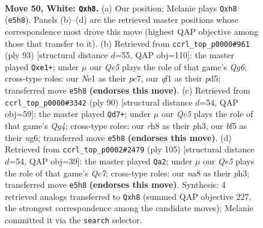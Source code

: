 \documentclass[11pt]{article}
\begin{document}
\clearpage

\begin{figure}[p]\centering
\begin{subfigure}{0.46\textwidth}\centering
\resizebox{\linewidth}{!}{%
\newchessgame
\chessboard[
  setfen={n6r/8/8/1p2Qbk1/7p/P2P4/7K/4Nq2 w - - 14 50},
  showmover=false,
  pgfstyle=straightmove, color=movearrow, markmove={e5-h8}
]}
\caption{}
\end{subfigure}\hfill
\begin{subfigure}{0.46\textwidth}\centering
\resizebox{\linewidth}{!}{%
\newchessgame
\chessboard[
  setfen={7k/2P5/7b/3Pp2Q/1P5p/6q1/6B1/4R1K1 b - - 4 47},
  showmover=false,
  pgfstyle=straightmove, color=movearrow, markmove={g3-e1}
]}
\caption{}
\end{subfigure}
\\[4pt]
\begin{subfigure}{0.46\textwidth}\centering
\resizebox{\linewidth}{!}{%
\newchessgame
\chessboard[
  setfen={8/6k1/3P2n1/p7/6Q1/7p/3qN1PP/7K w - - 1 46},
  showmover=false,
  pgfstyle=straightmove, color=movearrow, markmove={g4-d7}
]}
\caption{}
\end{subfigure}\hfill
\begin{subfigure}{0.46\textwidth}\centering
\resizebox{\linewidth}{!}{%
\newchessgame
\chessboard[
  setfen={6k1/8/p7/P2p4/3Qn1P1/7P/2q2BK1/8 b - - 6 53},
  showmover=false,
  pgfstyle=straightmove, color=movearrow, markmove={c2-a2}
]}
\caption{}
\end{subfigure}
\caption{\textbf{Move 50, White: \texttt{Qxh8}.} (a) Our position; Melanie plays \texttt{Qxh8} (\texttt{e5h8}). Panels (b)--(d) are the retrieved master positions whose correspondence most drove this move (highest QAP objective among those that transfer to it). (b) Retrieved from \texttt{ccrl\_top\_p0000\#961} (ply 93) [structural distance $d$=55, QAP obj=110]: the master played \texttt{Qxe1+}; under $\mu$ our \emph{Qe5} plays the role of that game's \emph{Qg6}; cross-type roles: our \emph{N}e1 as their \emph{p}c7, our \emph{q}f1 as their \emph{p}d5; transferred move \texttt{e5h8} \textbf{(endorses this move)}. (c) Retrieved from \texttt{ccrl\_top\_p0000\#3342} (ply 90) [structural distance $d$=54, QAP obj=59]: the master played \texttt{Qd7+}; under $\mu$ our \emph{Qe5} plays the role of that game's \emph{Qg4}; cross-type roles: our \emph{r}h8 as their \emph{p}h3, our \emph{b}f5 as their \emph{n}g6; transferred move \texttt{e5h8} \textbf{(endorses this move)}. (d) Retrieved from \texttt{ccrl\_top\_p0002\#2479} (ply 105) [structural distance $d$=54, QAP obj=39]: the master played \texttt{Qa2}; under $\mu$ our \emph{Qe5} plays the role of that game's \emph{Qc7}; cross-type roles: our \emph{n}a8 as their \emph{p}h3; transferred move \texttt{e5h8} \textbf{(endorses this move)}. Synthesis: 4 retrieved analogs transferred to \texttt{Qxh8} (summed QAP objective 227, the strongest correspondence among the candidate moves); Melanie committed it via the \texttt{search} selector.}
\label{fig:thought-m98}
\end{figure}
\end{document}
